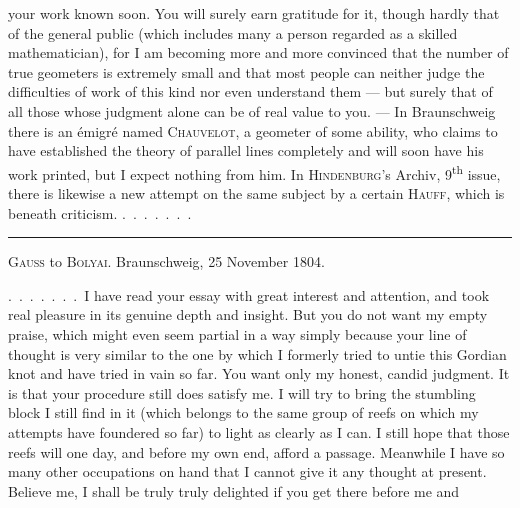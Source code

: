 your work known soon. You will surely earn gratitude for it, though hardly that
of the general public (which includes many a person regarded as
a skilled mathematician), for I am becoming more and more convinced
that the number of true geometers is extremely small and that most people
can neither judge the difficulties of work of this kind
nor even understand them --- but surely that of all
those whose judgment alone can be of real value to you. --- In
Braunschweig there is an émigré named \textsc{Chauvelot}, a
geometer of some ability, who claims to have established the theory
of parallel lines completely and will soon have his work printed,
but I expect nothing from him. In
\textsc{Hindenburg}'s Archiv, 9\textsuperscript{th} issue, there is
likewise a new attempt on the same subject by
a certain \textsc{Hauff}, which is beneath criticism. .\, .\, .\, .\, .\, .\, .

\medskip
\begin{center}
\rule{0.3\textwidth}{0.4pt}
\end{center}
\medskip

\begin{center}
\textsc{Gauss} to \textsc{Bolyai}. Braunschweig, 25 November 1804.
\end{center}

.\, .\, .\, .\, .\, .\, .\ I have read your essay with great interest and
attention, and took real pleasure in its genuine depth and insight.
But you do not want my empty praise, which might even
seem partial in a way simply because your
line of thought is very similar to the one by which I
formerly tried to untie this Gordian knot and have tried in vain
so far. You want only my honest, candid
judgment. It is that your procedure still does
satisfy me. I will try to bring the stumbling block I
still find in it (which belongs to the same group of reefs
on which my attempts have foundered so far) to light
as clearly as I can. I still hope
that those reefs will one day, and before my own
end, afford a passage. Meanwhile I have so
many other occupations on hand that I cannot give it
any thought at present. Believe me, I shall be truly
truly delighted if you get there before me and
